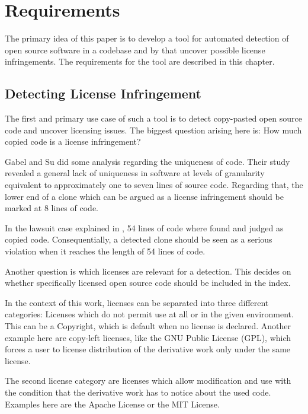 
\chapter{Requirements}\label{chapter:requirements}
The primary idea of this paper is to develop a tool for automated detection of open source software in a codebase and by that uncover possible license infringements.
The requirements for the tool are described in this chapter.

\section{Detecting License Infringement}\label{section:requirements/detecting_infringement}
The first and primary use case of such a tool is to detect copy-pasted open source code and uncover licensing issues.
The biggest question arising here is: How much copied code is a license infringement?

Gabel and Su did some analysis regarding the uniqueness of code.
Their study \glqq revealed a general lack of uniqueness in software at levels of granularity equivalent to approximately one to seven lines of source code\grqq \cite{2010-gabel-su-source-code-uniqueness}.
Regarding that, the lower end of a clone which can be argued as a license infringement should be marked at 8 lines of code.

In the lawsuit case explained in \cite{mertzel2008copying}, 54 lines of code where found and judged as copied code.
Consequentially, a detected clone should be seen as a serious violation when it reaches the length of 54 lines of code.

Another question is which licenses are relevant for a detection.
This decides on whether specifically licensed open source code should be included in the index.

In the context of this work, licenses can be separated into three different categories:
Licenses which do not permit use at all or in the given environment.
This can be a Copyright, which is default when no license is declared.
Another example here are copy-left licenses, like the GNU Public License (GPL), which forces a user to license distribution of the derivative work only under the same license.

The second license category are licenses which allow modification and use with the condition that the derivative work has to notice about the used code.
Examples here are the Apache License or the MIT License.

